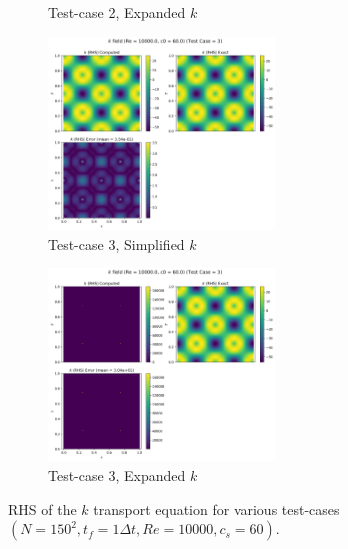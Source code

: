 \begin{figure}[H]
\begin{subfigure}{7cm}
    \caption{Test-case 2, Expanded $k$}
  \end{subfigure}
  \begin{subfigure}{7cm}
    \centering\includegraphics[width=6cm]{Code-Figures/keps/keps-op-conv/c0_60_ke_expd_no_ketc_3_nx_150_re_10000/k_rhs.png}
    \caption{Test-case 3, Simplified $k$}
  \end{subfigure}
  \begin{subfigure}{7cm}
    \centering\includegraphics[width=6cm]{Code-Figures/keps/keps-op-conv/c0_60_ke_expd_yes_ketc_3_nx_150_re_10000/k_rhs.png}
    \caption{Test-case 3, Expanded $k$}
  \end{subfigure}
  \caption{RHS of the $k$ transport equation for various test-cases $(N=150^2, t_f=1\Delta t, Re=10000, c_s=60)$.}
  \label{fig:k-spatial-ooc-field}
\end{figure}

